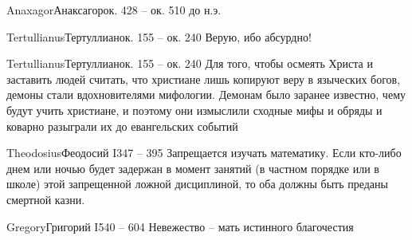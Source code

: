 \documentclass[aspectratio=169]{beamer}
\begin{document}

\begin{frame}
\begin{center}
\end{center}
\end{frame}

\begin{Person}{Anaxagor}{Анаксагор}{ок. 428 -- ок. 510 до н.э.}


\end{Person}

\begin{Person}{Tertullianus}{Тертуллиан}{ок. 155 -- ок. 240}
Верую, ибо абсурдно!
\end{Person}

\begin{Person}{Tertullianus}{Тертуллиан}{ок. 155 -- ок. 240}
Для того, чтобы осмеять Христа и заставить людей считать, что христиане лишь копируют веру в языческих богов, демоны стали вдохновителями мифологии. Демонам было заранее известно, чему будут учить христиане, и поэтому они измыслили сходные мифы и обряды и коварно разыграли их до евангельских событий
\end{Person}

\begin{Person}{Theodosius}{Феодосий I}{347 -- 395}
Запрещается изучать математику. Если кто-либо днем или ночью будет задержан в момент занятий (в частном порядке или в школе) этой запрещенной ложной дисциплиной, то оба должны быть преданы смертной казни.
\end{Person}	

\begin{Person}{Gregory}{Григорий I}{540 -- 604}
Невежество -- мать истинного благочестия
\end{Person}
\end{document}
